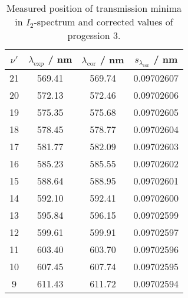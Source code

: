 \begin{table}[H]
\caption{Measured position of transmission minima in $I_2$-spectrum and corrected values of progession 3.}
\begin{center}
\begin{tabular}{|c|c|c|c|}
  \hline
  $\nu'$ & $\lambda_{\text{exp}}$ / nm & $\lambda_{\text{cor}}$ / nm & $s_{\lambda_{\text{cor}}}$ / nm \\ \hline
  21 & 569.41 & 569.74 & 0.09702607 \\ \hline
  20 & 572.13 & 572.46 & 0.09702606 \\ \hline
  19 & 575.35 & 575.68 & 0.09702605 \\ \hline
  18 & 578.45 & 578.77 & 0.09702604 \\ \hline
  17 & 581.77 & 582.09 & 0.09702603 \\ \hline
  16 & 585.23 & 585.55 & 0.09702602 \\ \hline
  15 & 588.64 & 588.95 & 0.09702601 \\ \hline
  14 & 592.10 & 592.41 & 0.09702600 \\ \hline
  13 & 595.84 & 596.15 & 0.09702599 \\ \hline
  12 & 599.61 & 599.91 & 0.09702597 \\ \hline
  11 & 603.40 & 603.70 & 0.09702596 \\ \hline
  10 & 607.45 & 607.74 & 0.09702595 \\ \hline
  9 & 611.43 & 611.72 & 0.09702594 \\ \hline
\end{tabular}
\end{center}
\label{tab:prog3}
\end{table}
